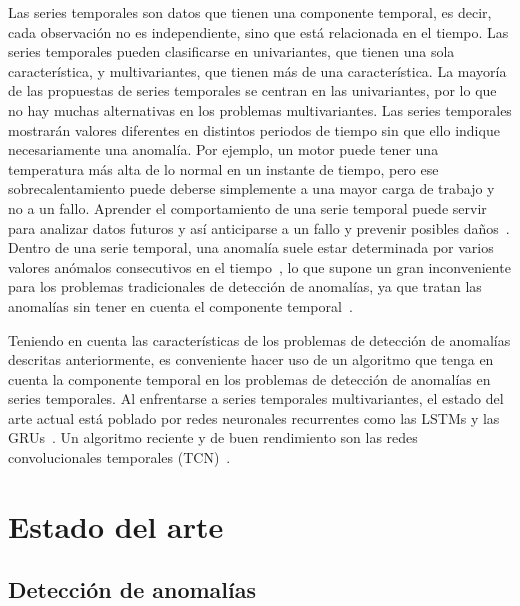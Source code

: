 \documentclass{article}
\begin{document}
	
	Las series temporales son datos que tienen una componente temporal, es decir, cada observación no es independiente, sino que está relacionada en el tiempo. Las series temporales pueden clasificarse en univariantes, que tienen una sola característica, y multivariantes, que tienen más de una característica. La mayoría de las propuestas de series temporales se centran en las univariantes, por lo que no hay muchas alternativas en los problemas multivariantes. Las series temporales mostrarán valores diferentes en distintos periodos de tiempo sin que ello indique necesariamente una anomalía. Por ejemplo, un motor puede tener una temperatura más alta de lo normal en un instante de tiempo, pero ese sobrecalentamiento puede deberse simplemente a una mayor carga de trabajo y no a un fallo. Aprender el comportamiento de una serie temporal puede servir para analizar datos futuros y así anticiparse a un fallo y prevenir posibles daños~\cite{zhang2003time, piccialli20211}. Dentro de una serie temporal, una anomalía suele estar determinada por varios valores anómalos consecutivos en el tiempo~\cite{carrasco2021440}, lo que supone un gran inconveniente para los problemas tradicionales de detección de anomalías, ya que tratan las anomalías sin tener en cuenta el componente temporal~\cite{tatbul2018precision}.
	
	Teniendo en cuenta las características de los problemas de detección de anomalías descritas anteriormente, es conveniente hacer uso de un algoritmo que tenga en cuenta la componente temporal en los problemas de detección de anomalías en series temporales. Al enfrentarse a series temporales multivariantes, el estado del arte actual está poblado por redes neuronales recurrentes como las LSTMs y las GRUs~\cite{bai2018empirical}. Un algoritmo reciente y de buen rendimiento son las redes convolucionales temporales (TCN)~\cite{bai2018empirical, lea2016temporal}.
	
	\section{Estado del arte}
	
	\subsection{Detección de anomalías}
	
	
	
	
	
	
\end{document}

